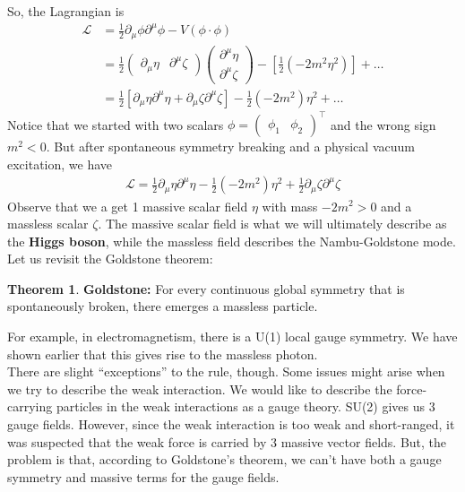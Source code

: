 \documentclass{book}
\numberwithin{equation}{section}
\theoremstyle{definition}
\newtheorem{thm}{Theorem}[section]
\newcommand{\p}{\partial}
\newcommand{\lag}{\mathcal{L}}
\begin{document}
So, the Lagrangian is
\begin{align}
\lag &= \frac{1}{2}\p_\mu\phi\p^\mu\phi - V(\phi \cdot \phi)\\
&= \frac{1}{2}\begin{pmatrix}
\p_\mu\eta & \p^\mu\zeta
\end{pmatrix}
\begin{pmatrix}
\p^\mu\eta\\ \p^\mu\zeta
\end{pmatrix} - \left[\frac{1}{2}(-2m^2\eta^2)\right] + \dots\\
&= \frac{1}{2}\left[\p_\mu\eta \p^\mu\eta + \p_\mu\zeta \p^\mu\zeta\right] - \frac{1}{2}(-2m^2)\eta^2+\dots
\end{align}
Notice that we started with two scalars $\phi = \begin{pmatrix}
\phi_1&\phi_2
\end{pmatrix}^\top$ and the wrong sign $m^2 < 0$. But after spontaneous symmetry breaking and a physical vacuum excitation, we have
\begin{align}
\lag = \boxed{\frac{1}{2}\p_\mu\eta \p^\mu\eta - \frac{1}{2}(-2m^2)\eta^2} + \boxed{\frac{1}{2}\p_\mu\zeta \p^\mu\zeta}
\end{align}
Observe that we a get 1 massive scalar field $\eta$ with mass $-2m^2 > 0$ and a massless scalar $\zeta$. The massive scalar field is what we will ultimately describe as the \textbf{Higgs boson}, while the massless field describes the Nambu-Goldstone mode. Let us revisit the Goldstone theorem:\\

\begin{thm}
	\textbf{Goldstone:} For every continuous global symmetry that is spontaneously broken, there emerges a massless particle. 
\end{thm}

For example, in electromagnetism, there is a U(1) local gauge symmetry. We have shown earlier that this gives rise to the massless photon.\\

There are slight ``exceptions'' to the rule, though. Some issues might arise when we try to describe the weak interaction. We would like to describe the force-carrying particles in the weak interactions as a gauge theory. SU(2) gives us 3 gauge fields. However, since the weak interaction is too weak and short-ranged, it was suspected that the weak force is carried by 3 massive vector fields. But, the problem is that, according to Goldstone's theorem, we can't have both a gauge symmetry and massive terms for the gauge fields. \\
\end{document}
